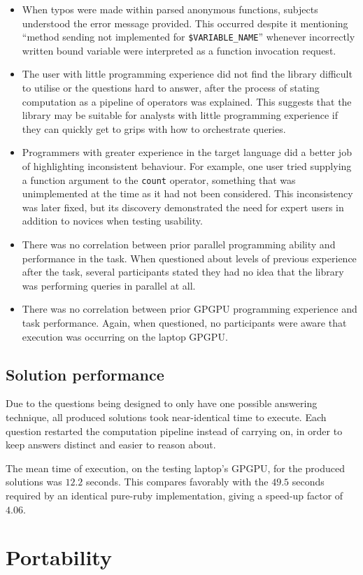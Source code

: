 \begin{itemize}
  \item  When typos were made within parsed anonymous functions, subjects understood the error message provided. This occurred despite it mentioning ``method sending not implemented for \verb|$VARIABLE_NAME|'' whenever incorrectly written bound variable were interpreted as a function invocation request.

  \item The user with little programming experience did not find the library difficult to utilise or the questions hard to answer, after the process of stating computation as a pipeline of operators was explained. This suggests that the library may be suitable for analysts with little programming experience if they can quickly get to grips with how to orchestrate queries.

  \item Programmers with greater experience in the target language did a better job of highlighting inconsistent behaviour. For example, one user tried supplying a function argument to the \verb|count| operator, something that was unimplemented at the time as it had not been considered. This inconsistency was later fixed, but its discovery demonstrated the need for expert users in addition to novices when testing usability.

  \item There was no correlation between prior parallel programming ability and performance in the task. When questioned about levels of previous experience after the task, several participants stated they had no idea that the library was performing queries in parallel at all.

  \item There was no correlation between prior \ac{GPGPU} programming experience and task performance. Again, when questioned, no participants were aware that execution was occurring on the laptop \ac{GPGPU}.

\end{itemize}

\subsection{Solution performance}
Due to the questions being designed to only have one possible answering technique, all produced solutions took near-identical time to execute.
Each question restarted the computation pipeline instead of carrying on, in order to keep answers distinct and easier to reason about.

The mean time of execution, on the testing laptop's \ac{GPGPU}, for the produced solutions was $12.2$ seconds.
This compares favorably with the $49.5$ seconds required by an identical pure-ruby implementation, giving a speed-up factor of $4.06$.

\section{Portability}
